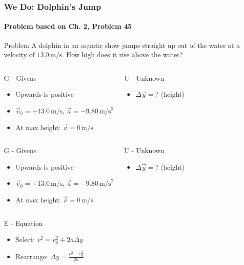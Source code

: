 \documentclass{beamer}
\begin{document}
\begin{frame}
\frametitle{We Do: Dolphin's Jump}
\framesubtitle{Problem based on Ch. 2, Problem 45}
\begin{block}{Problem}
A dolphin in an aquatic show jumps straight up out of the water at a velocity of $13.0 \, \text{m/s}$. How high does it rise above the water?
\end{block}
\pause
\begin{columns}[T]
\begin{block}{G - Givens}
\begin{itemize}
\item Upwards is positive
\item $\vec{v}_0 = +13.0 \, \text{m/s}$, $\vec{a} = -9.80 \, \text{m/s}^2$
\item At max height: $\vec{v} = 0 \, \text{m/s}$
\end{itemize}
\end{block}
\pause
{}
\begin{block}{U - Unknown}
\begin{itemize}
\item $\Delta \vec{y} = ?$ (height)
\end{itemize}
\end{block}
\end{columns}
\end{frame}

\begin{frame}
\begin{columns}[T]
\begin{block}{G - Givens}
\begin{itemize}
\item Upwards is positive
\item $\vec{v}_0 = +13.0 \, \text{m/s}$, $\vec{a} = -9.80 \, \text{m/s}^2$
\item At max height: $\vec{v} = 0 \, \text{m/s}$
\end{itemize}
\end{block}
\pause
{}
\begin{block}{U - Unknown}
\begin{itemize}
\item $\Delta \vec{y} = ?$ (height)
\end{itemize}
\end{block}
\end{columns}
\pause
\begin{columns}[T]
\begin{block}{E - Equation}
\begin{itemize}
\item Select: $v^2 = v_0^2 + 2a\Delta y$
\item Rearrange: $\Delta y = \frac{v^2 - v_0^2}{2a}$
\end{itemize}
\end{block}
\end{columns}
\end{frame}
\end{document}
